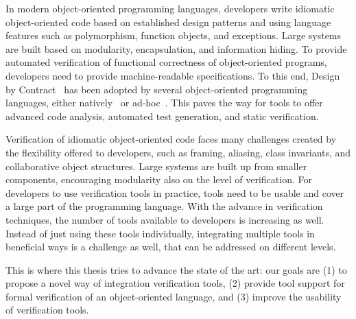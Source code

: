 In modern object-oriented programming languages, developers write idiomatic object-oriented code based on established design patterns and using language features such as polymorphism, function objects, and exceptions.
Large systems are built based on modularity, encapsulation, and information hiding.
To provide automated verification of functional correctness of object-oriented programs, developers need to provide machine-readable specifications.
To this end, Design by Contract~\cite{MEYER92} has been adopted by several object-oriented programming languages, either natively~\cite{MEYER97,AMEER07} or ad-hoc~\cite{BARNETT10,LEAVENS05}.
This paves the way for tools to offer advanced code analysis, automated test generation, and static verification.

Verification of idiomatic object-oriented code faces many challenges created by the flexibility offered to developers, such as framing, aliasing, class invariants, and collaborative object structures.
Large systems are built up from smaller components, encouraging modularity also on the level of verification.
For developers to use verification tools in practice, tools need to be usable and cover a large part of the programming language.
With the advance in verification techniques, the number of tools available to developers is increasing as well.
Instead of just using these tools individually, integrating multiple tools in beneficial ways is a challenge as well, that can be addressed on different levels.

This is where this thesis tries to advance the state of the art: our goals are (1) to propose a novel way of integration verification tools, (2) provide tool support for formal verification of an object-oriented language, and (3) improve the usability of verification tools.



